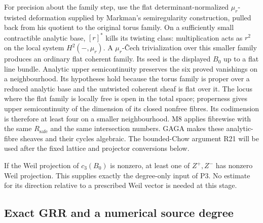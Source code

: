 For precision about the family step, use the flat determinant-normalized
$\mu_r$-twisted deformation supplied by Markman's semiregularity
construction, pulled back from his quotient to the original torus
family. On a sufficiently small contractible analytic base,
$[r]^*$ kills its twisting class: multiplication acts as $r^2$ on
the local system $H^2(-,\mu_r)$. A $\mu_r$-\v Cech trivialization
over this smaller family produces an ordinary flat coherent family.
Its seed is the displayed $B_0$ up to a flat line bundle.
Analytic upper semicontinuity
\citep[\S7, Satz~3, pp.~62--63]{Grauert60}
preserves the six proved vanishings on a neighbourhood. Its
hypotheses hold because the torus family is proper over a reduced
analytic base and the untwisted coherent sheaf is flat over it.
The locus where the flat family is locally free is
open in the total space; properness gives upper semicontinuity of
the dimension of its closed nonfree fibres. Its codimension is
therefore at least four on a smaller neighbourhood.
M8 applies fibrewise with the same $R_{\mathrm{safe}}$ and the same
intersection numbers. GAGA makes these analytic-fibre sheaves and
their cycles algebraic. The bounded-Chow argument R21 will be used
after the fixed lattice and projector conversions below.

If the Weil projection of $c_3(B_0)$ is nonzero, at least one of
$Z^+,Z^-$ has nonzero Weil projection. This supplies exactly the
degree-only input of P3. No estimate for its direction relative to
a prescribed Weil vector is needed at this stage.

\subsection{Exact GRR and a numerical source degree}

